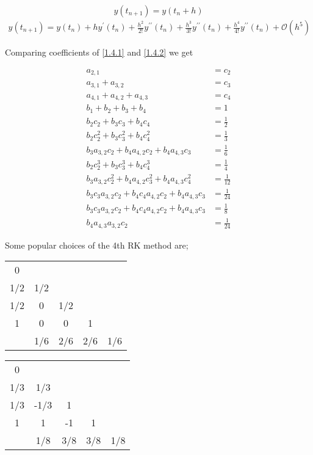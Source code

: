 \documentclass[12pt,a4paper]{article}
\begin{document}
$$y(t_{n + 1}) = y(t_n + h) $$
\begin{align*}\tag{1.4.2}\label{1.4.2}
y(t_{n + 1})= y(t_n)+ hy^\prime (t_n) + \frac{h^2}{2!}y^{\prime\prime}(t_n) + \frac{h^3}{3!}y^{\prime\prime}(t_n) + \frac{h^4}{4!}y^{\prime\prime}(t_n) + \mathcal{O}(h^5)  
\end{align*}

Comparing coefficients of \ref{1.4.1} and \ref{1.4.2} we get

\begin{align*}
a_{2,1} &= c_2 \\
a_{3,1} + a_{3,2} &= c_3 \\
a_{4,1} + a_{4,2} + a_{4,3} &= c_4  \\
b_1 + b_2 + b_3 + b_4 &= 1 \\
b_2c_2 + b_3 c_3 + b_4c_4 &= \frac{1}{2} \\
b_2c_2^2 + b_3 c_3^2 + b_4c_4^2 &= \frac{1}{3} \\
b_3a_{3,2}c_2 + b_4a_{4,2}c_2 + b_4a_{4,3}c_3 &= \frac{1}{6} \\
b_2c_2^3 + b_3 c_3^3 + b_4c_4^3 &= \frac{1}{4} \\
b_3a_{3,2}c_2^2 + b_4a_{4,2}c_3^2 + b_4a_{4,3}c_4^2 &= \frac{1}{12} \\
b_3c_3a_{3,2}c_2 + b_4c_4a_{4,2}c_2 + b_4a_{4,3}c_3 &= \frac{1}{24} \\
b_3c_3a_{3,2}c_2 + b_4c_4a_{4,2}c_2 + b_4a_{4,3}c_3 &= \frac{1}{8} \\
b_4a_{4,3}a_{3,2}c_2 &= \frac{1}{24} 
\end{align*}

Some popular choices of the 4th RK method are;

\begin{center}
\begin{tabular}{c|cccc}
0\\
1/2&1/2\\
1/2&0&1/2\\
1&0&0&1\\
\hline
&1/6&2/6&2/6&1/6
\end{tabular}
\end{center}

\begin{center}
\begin{tabular}{c|cccc}
0\\
1/3&1/3\\
1/3&-1/3&1\\
1&1&-1&1\\
\hline
&1/8&3/8&3/8&1/8
\end{tabular}
\end{center}
\end{document}
